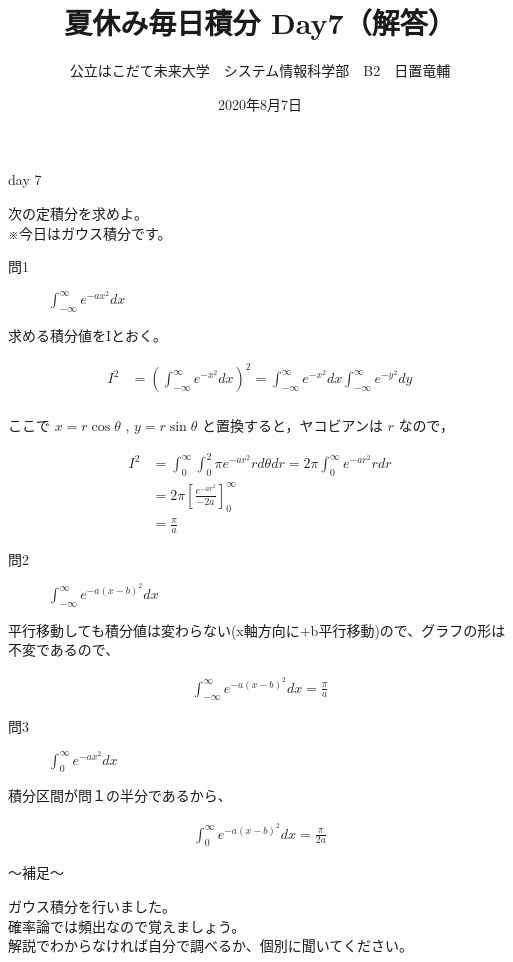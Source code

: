 \documentclass[dvipdfmx,uplatex]{jsarticle}
\title{夏休み毎日積分 Day7（解答）}
\author{公立はこだて未来大学　システム情報科学部　B2　日置竜輔}
\date{2020年8月7日}
\begin{document}
\maketitle

\begin{itembox}{day 7}
    \begin{center}
        次の定積分を求めよ。\\
        ※今日はガウス積分です。
    \end{center}
\end{itembox}

\begin{description}
    \item [問1] $\displaystyle \int_{-\infty}^{\infty} e^{-ax^2} dx$
\end{description}

求める積分値をIとおく。

\begin{align*}
    I^2 &= \left(\int_{-\infty}^{\infty} e^{-x^2} dx\right)^2
    =  \int_{-\infty}^{\infty} e^{-x^2} dx \int_{-\infty}^{\infty} e^{-y^2} dy\\
\end{align*}

ここで $x = r\cos\theta$ , $y = r\sin\theta$ と置換すると，ヤコビアンは $r$ なので，

\begin{align*}
    I^2 &= \int_0^{\infty} \int_0^2{\pi} e^{-ar^2} r d{\theta}dr
    = 2{\pi} \int_0^{\infty} e^{-ar^2} r dr \\
    &= 2{\pi} \left[\frac{e^{-ar^2}}{-2a}\right]_0^{\infty} \\
    &= \frac{\pi}{a}
\end{align*}

\begin{description}
    \item [問2] $\displaystyle \int_{-\infty}^{\infty} e^{-a(x-b)^2} dx$
\end{description}

平行移動しても積分値は変わらない(x軸方向に+b平行移動)ので、グラフの形は不変であるので、

\begin{align*}
    \int_{-\infty}^{\infty} e^{-a(x-b)^2} dx = \frac{\pi}{a}
\end{align*}

\begin{description}
    \item [問3] $\displaystyle \int_0^{\infty} e^{-ax^2} dx$
\end{description}

積分区間が問１の半分であるから、

\begin{align*}
    \int_0^{\infty} e^{-a(x-b)^2} dx = \frac{\pi}{2a}
\end{align*}

\begin{boxnote}
    〜補足〜
    \begin{center}
        ガウス積分を行いました。\\
        確率論では頻出なので覚えましょう。\\
        解説でわからなければ自分で調べるか、個別に聞いてください。
    \end{center}
\end{boxnote}
\end{document}
